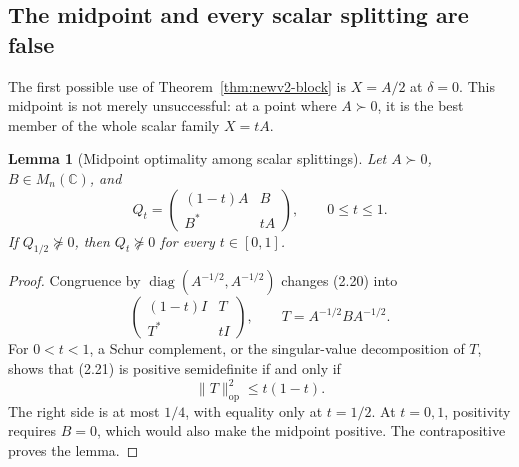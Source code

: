 \documentclass[11pt,oneside]{article}
\newtheorem{lemma}[theorem]{Lemma}
\theoremstyle{definition}
\theoremstyle{remark}
\begin{document}
\subsection{The midpoint and every scalar splitting are false}

The first possible use of Theorem~\ref{thm:newv2-block} is
\(X=A/2\) at \(\delta=0\).  This midpoint is not merely unsuccessful:
at a point where \(A\succ0\), it is the best member of the whole
scalar family \(X=tA\).

\begin{lemma}[Midpoint optimality among scalar splittings]
\label{lem:newv2-midpoint-optimal}
Let \(A\succ0\), \(B\in M_n(\mathbb C)\), and
\[
 Q_t=\begin{pmatrix}(1-t)A&B\\B^*&tA\end{pmatrix},
 \qquad 0\le t\le1.                                      \tag{2.20}
\]
If \(Q_{1/2}\not\succeq0\), then \(Q_t\not\succeq0\) for every
\(t\in[0,1]\).
\end{lemma}

\begin{proof}
Congruence by
\(\operatorname{diag}(A^{-1/2},A^{-1/2})\) changes (2.20) into
\[
 \begin{pmatrix}(1-t)I&T\\T^*&tI\end{pmatrix},
 \qquad T=A^{-1/2}BA^{-1/2}.                              \tag{2.21}
\]
For \(0<t<1\), a Schur complement, or the singular-value
decomposition of \(T\), shows that (2.21) is positive semidefinite
if and only if
\[
 \|T\|_{\mathrm{op}}^2\le t(1-t).                        \tag{2.22}
\]
The right side is at most \(1/4\), with equality only at \(t=1/2\).
At \(t=0,1\), positivity requires \(B=0\), which would also make the
midpoint positive.  The contrapositive proves the lemma.
\end{proof}
\end{document}
